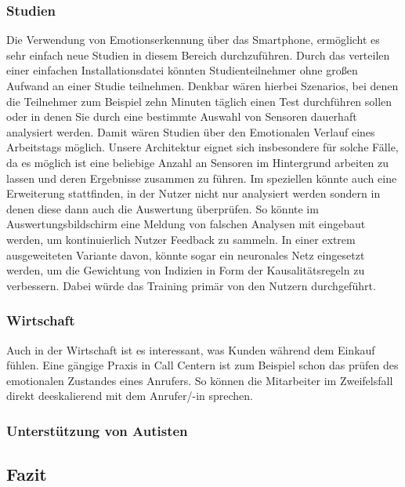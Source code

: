 \subsubsection{Studien}
Die Verwendung von Emotionserkennung über das Smartphone, ermöglicht es sehr einfach neue Studien in diesem Bereich durchzuführen. Durch das verteilen einer einfachen Installationsdatei könnten Studienteilnehmer ohne großen Aufwand an einer Studie teilnehmen. Denkbar wären hierbei Szenarios, bei denen die Teilnehmer zum Beispiel zehn Minuten täglich einen Test durchführen sollen oder in denen Sie durch eine bestimmte Auswahl von Sensoren dauerhaft analysiert werden. Damit wären Studien über den Emotionalen Verlauf eines Arbeitstags möglich.\newline
Unsere Architektur eignet sich insbesondere für solche Fälle, da es möglich ist eine beliebige Anzahl an Sensoren im Hintergrund arbeiten zu lassen und deren Ergebnisse zusammen zu führen. Im speziellen könnte auch eine Erweiterung stattfinden, in der Nutzer nicht nur analysiert werden sondern in denen diese dann auch die Auswertung überprüfen. So könnte im Auswertungsbildschirm eine Meldung von falschen Analysen mit eingebaut werden, um kontinuierlich Nutzer Feedback zu sammeln. In einer extrem ausgeweiteten Variante davon, könnte sogar ein neuronales Netz eingesetzt werden, um die Gewichtung von Indizien in Form der Kausalitätsregeln zu verbessern. Dabei würde das Training primär von den Nutzern durchgeführt. 
\subsubsection{Wirtschaft}
Auch in der Wirtschaft ist es interessant, was Kunden während dem Einkauf fühlen. Eine gängige Praxis in Call Centern ist zum Beispiel schon das prüfen des emotionalen Zustandes eines Anrufers. So können die Mitarbeiter im Zweifelsfall direkt deeskalierend mit dem Anrufer/-in sprechen.
\subsubsection{Unterstützung von Autisten}
\subsection{Fazit}

